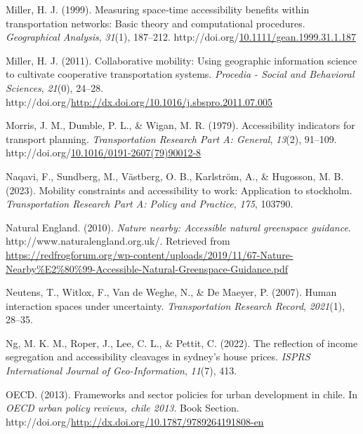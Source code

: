 \documentclass[
11pt, %
oneside, %
english, %
singlespacing, %
]{macthesis} %
\newlength{\cslhangindent}
\newenvironment{CSLReferences}[2] %
{\begin{list}{}{%
	\setlength{\itemindent}{0pt}
	\setlength{\leftmargin}{0pt}
	\setlength{\parsep}{0pt}
	\ifodd #1
	\setlength{\leftmargin}{\cslhangindent}
	\setlength{\itemindent}{-1\cslhangindent}
	\fi
	\setlength{\itemsep}{#2\baselineskip}}}
{\end{list}}
\begin{document}
\begin{CSLReferences}{1}{0}
Miller, H. J. (1999). Measuring space‐time accessibility benefits within transportation networks: Basic theory and computational procedures. \emph{Geographical Analysis}, \emph{31}(1), 187--212. http://doi.org/\href{https://doi.org/10.1111/gean.1999.31.1.187}{10.1111/gean.1999.31.1.187}

Miller, H. J. (2011). Collaborative mobility: Using geographic information science to cultivate cooperative transportation systems. \emph{Procedia - Social and Behavioral Sciences}, \emph{21}(0), 24--28. http://doi.org/\url{http://dx.doi.org/10.1016/j.sbspro.2011.07.005}

Morris, J. M., Dumble, P. L., \& Wigan, M. R. (1979). Accessibility indicators for transport planning. \emph{Transportation Research Part A: General}, \emph{13}(2), 91--109. http://doi.org/\href{https://doi.org/10.1016/0191-2607(79)90012-8}{10.1016/0191-2607(79)90012-8}

Naqavi, F., Sundberg, M., Västberg, O. B., Karlström, A., \& Hugosson, M. B. (2023). Mobility constraints and accessibility to work: Application to stockholm. \emph{Transportation Research Part A: Policy and Practice}, \emph{175}, 103790.

Natural England. (2010). \emph{Nature nearby: Accessible natural greenspace guidance}. http://www.naturalengland.org.uk/. Retrieved from \url{https://redfrogforum.org/wp-content/uploads/2019/11/67-Nature-Nearby\%E2\%80\%99-Accessible-Natural-Greenspace-Guidance.pdf}

Neutens, T., Witlox, F., Van de Weghe, N., \& De Maeyer, P. (2007). Human interaction spaces under uncertainty. \emph{Transportation Research Record}, \emph{2021}(1), 28--35.

Ng, M. K. M., Roper, J., Lee, C. L., \& Pettit, C. (2022). The reflection of income segregation and accessibility cleavages in sydney's house prices. \emph{ISPRS International Journal of Geo-Information}, \emph{11}(7), 413.

OECD. (2013). Frameworks and sector policies for urban development in chile. In \emph{OECD urban policy reviews, chile 2013}. Book Section. http://doi.org/\url{http://dx.doi.org/10.1787/9789264191808-en}


\end{CSLReferences}
\end{document}
